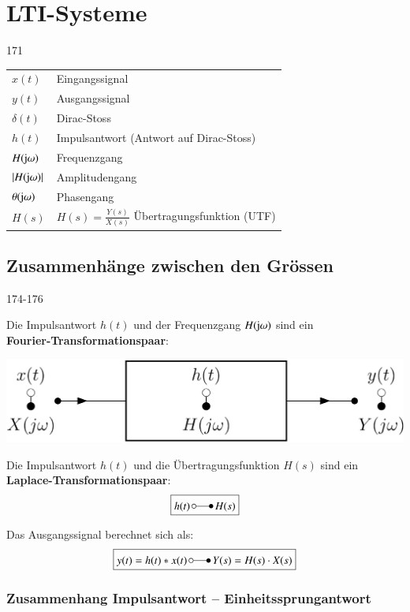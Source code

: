 \section{LTI-Systeme}{171}

\begin{tabular}{ll}
    $x(t)$                  & Eingangssignal \\
    $y(t)$                  & Ausgangssignal \\
    $\delta(t)$             & Dirac-Stoss \\
    $h(t)$                  & Impulsantwort (Antwort auf Dirac-Stoss) \\
    $H(\mathrm{j} \omega)$       & Frequenzgang \\
    $|H(\mathrm{j} \omega)|$     & Amplitudengang \\
    $\theta(\mathrm{j} \omega)$  & Phasengang \\
    $H(s)$                  & $H(s) = \frac{Y(s)}{X(s)}$ Übertragungsfunktion (UTF)
\end{tabular}


\subsection{Zusammenhänge zwischen den Grössen}{174-176}
\label{Zusammenhang}

Die Impulsantwort $h(t)$ und der Frequenzgang $H(\mathrm{j} \omega)$ sind ein \\
\textbf{Fourier-Transformationspaar}:

\begin{center}
    \includegraphics[width=0.7\columnwidth]{images/frequenzgang_impulsantwort.png} \\
\end{center}

Die Impulsantwort $h(t)$ und die Übertragungsfunktion $H(s)$ sind ein\\
\textbf{Laplace-Transformationspaar}:
$$ \boxed{ h(t) \, \laplace \, H(s) } $$

Das Ausgangssignal berechnet sich als: 
$$ \boxed{ y(t) = h(t) * x(t) \, \laplace \, Y(s) = H(s) \cdot X(s) } $$


\subsubsection{Zusammenhang Impulsantwort -- Einheitssprungantwort}

